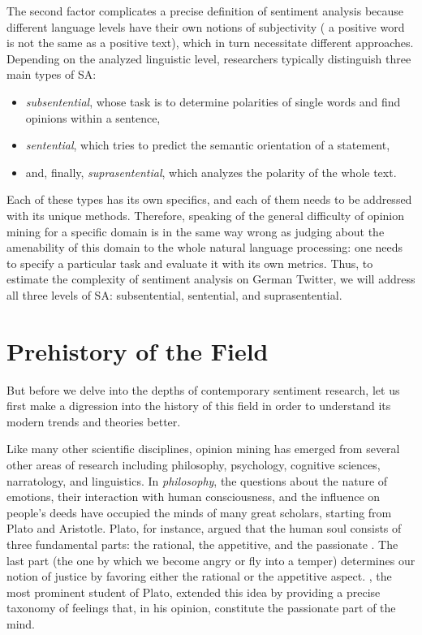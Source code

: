 The second factor complicates a precise definition of sentiment
analysis because different language levels have their own notions of
subjectivity (\eg{} a positive word is not the same as a positive
text), which in turn necessitate different approaches.  Depending on
the analyzed linguistic level, researchers typically distinguish three
main types of SA\@:
\begin{itemize}
  \item\emph{subsentential}, whose task is to determine polarities of
    single words and find opinions within a sentence,
  \item\emph{sentential}, which tries to predict the semantic
    orientation of a statement,
  \item and, finally, \emph{suprasentential}, which analyzes the
    polarity of the whole text.
\end{itemize}
Each of these types has its own specifics, and each of them needs to
be addressed with its unique methods.  Therefore, speaking of the
general difficulty of opinion mining for a specific domain is in the
same way wrong as judging about the amenability of this domain to the
whole natural language processing: one needs to specify a particular
task and evaluate it with its own metrics.  Thus, to estimate the
complexity of sentiment analysis on German Twitter, we will address
all three levels of SA\@: subsentential, sentential, and
suprasentential.

\section{Prehistory of the Field}

But before we delve into the depths of contemporary sentiment
research, let us first make a digression into the history of this
field in order to understand its modern trends and theories better.

Like many other scientific disciplines, opinion mining has emerged
from several other areas of research including philosophy, psychology,
cognitive sciences, narratology, and linguistics.  In
\emph{philosophy}, the questions about the nature of emotions, their
interaction with human consciousness, and the influence on people's
deeds have occupied the minds of many great scholars, starting from
Plato and Aristotle.  Plato, for instance, argued that the human soul
consists of three fundamental parts: the rational, the appetitive, and
the passionate \citep[see][Book~IV]{Plato:91}.  The last part (the one
by which we become angry or fly into a temper) determines our notion
of justice by favoring either the rational or the appetitive aspect.
\citet{Aristotle:54}, the most prominent student of Plato, extended
this idea by providing a precise taxonomy of feelings that, in his
opinion, constitute the passionate part of the mind.


